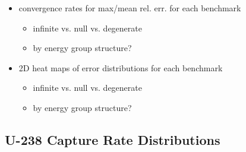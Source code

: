 \begin{itemize}[noitemsep]
  \item convergence rates for max/mean rel. err. for each benchmark
  \begin{itemize}[noitemsep]
    \item infinite vs. null vs. degenerate
    \item by energy group structure?
  \end{itemize}
  \item 2D heat maps of error distributions for each benchmark
  \begin{itemize}[noitemsep]
    \item infinite vs. null vs. degenerate
    \item by energy group structure?
  \end{itemize}
\end{itemize}

\subsection{U-238 Capture Rate Distributions}
\label{subsec:chap8-capt-rates}

